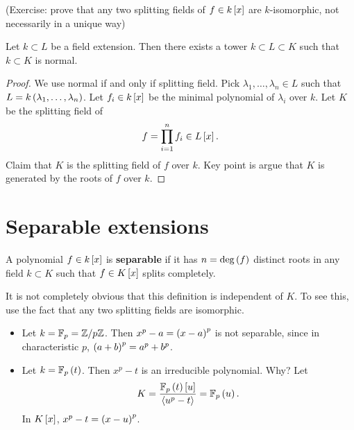 (Exercise: prove that any two splitting fields of $ f \in k\sb{x} $ are $ k $-isomorphic, not necessarily in a unique way)


\begin{proposition}
Let $ k \subset L $ be a field extension. Then there exists a tower $ k \subset L \subset K $ such that $ k \subset K $ is normal.
\end{proposition}

\begin{proof}
We use normal if and only if splitting field. Pick $ \lambda_1, \dots, \lambda_n \in L $ such that $ L = k\rb{\lambda_1, \dots, \lambda_n} $. Let $ f_i \in k\sb{x} $ be the minimal polynomial of $ \lambda_i $ over $ k $. Let $ K $ be the splitting field of
$$ f = \prod_{i = 1}^n f_i \in L\sb{x}. $$
Claim that $ K $ is the splitting field of $ f $ over $ k $. Key point is argue that $ K $ is generated by the roots of $ f $ over $ k $.
\end{proof}

\pagebreak

\section{Separable extensions}

\begin{definition}
A polynomial $ f \in k\sb{x} $ is \textbf{separable} if it has $ n = \deg\rb{f} $ distinct roots in any field $ k \subset K $ such that $ f \in K\sb{x} $ splits completely.
\end{definition}

\begin{remark*}
It is not completely obvious that this definition is independent of $ K $. To see this, use the fact that any two splitting fields are isomorphic.
\end{remark*}

\begin{example*}
\hfill
\begin{itemize}
\item Let $ k = \F_p = \Z / p\Z $. Then $ x^p - a = \rb{x - a}^p $ is not separable, since in characteristic $ p $, $ \rb{a + b}^p = a^p + b^p $.
\item Let $ k = \F_p\rb{t} $. Then $ x^p - t $ is an irreducible polynomial. Why? Let
$$ K = \dfrac{\F_p\rb{t}\sb{u}}{\ab{u^p - t}} = \F_p\rb{u}. $$
In $ K\sb{x} $, $ x^p - t = \rb{x - u}^p $.
\end{itemize}
\end{example*}

